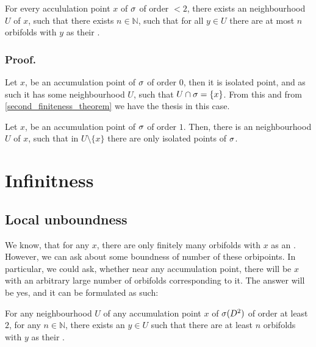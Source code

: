 


\begin{theorem}
For every accululation point $x$ of ${\sigma}$ of order $<2$, there exists an neighbourhood $U$ 
of $x$, such that there exists $n \in \mathbb{N}$, such that for all $y \in U$ there are at most 
$n$ orbifolds with $y$ as their \Eoc.
\end{theorem}
\subsubsection{Proof.} 
Let $x$, be an accumulation point of ${\sigma}$ of order $0$, then it is isolated point, and as such 
it has some neighbourhood $U$, such that $U\cap {\sigma} = \{x\}$. From this and from 
\ref{second_finiteness_theorem} we have the thesis in this case. 

Let $x$, be an accumulation point of ${\sigma}$ of order $1$. 
Then, there is an neighbourhood $U$ of $x$, such that in $U\setminus \{x\}$ there are only 
isolated points of ${\sigma}$.  



\section{Infinitness}\label{infiniteness}
\subsection{Local unboundness}
We know, that for any $x$, there are only finitely many orbifolds with $x$ as an \Eoc . 
However, we can ask about some boundness of number of these orbipoints. 
In particular, we could ask, whether near any accumulation point, there will be $x$ with an 
arbitrary large number of orbifolds corresponding to it. 
The answer will be yes, and it can be formulated as such:
\begin{theorem}\label{unboundness}
For any neighbourhood $U$ of any accumulation point $x$ of ${{\sigma}(D^2)}$ of order at least $2$, for any 
$n\in \mathbb{N}$, 
there exists an $y\in U$ such that there are at least $n$ orbifolds with $y$ as their 
\Eoc. 
\end{theorem}
